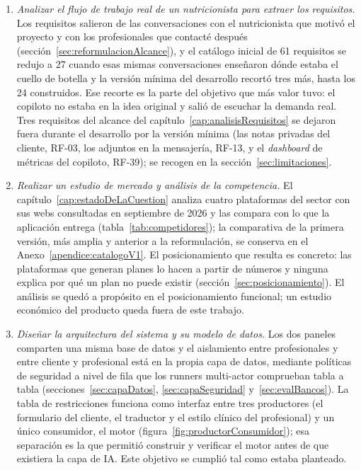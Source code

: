 \begin{enumerate}
    \item \textit{Analizar el flujo de trabajo real de un nutricionista para extraer los requisitos.} Los requisitos salieron de las conversaciones con el nutricionista que motivó el proyecto y con los profesionales que contacté después (sección~\ref{sec:reformulacionAlcance}), y el catálogo inicial de 61 requisitos se redujo a 27 cuando esas mismas conversaciones enseñaron dónde estaba el cuello de botella y la versión mínima del desarrollo recortó tres más, hasta los 24 construidos. Ese recorte es la parte del objetivo que más valor tuvo: el copiloto no estaba en la idea original y salió de escuchar la demanda real. Tres requisitos del alcance del capítulo~\ref{cap:analisisRequisitos} se dejaron fuera durante el desarrollo por la versión mínima (las notas privadas del cliente, RF-03, los adjuntos en la mensajería, RF-13, y el \textit{dashboard} de métricas del copiloto, RF-39); se recogen en la sección~\ref{sec:limitaciones}.

    \item \textit{Realizar un estudio de mercado y análisis de la competencia.} El capítulo~\ref{cap:estadoDeLaCuestion} analiza cuatro plataformas del sector con sus webs consultadas en septiembre de 2026 y las compara con lo que la aplicación entrega (tabla~\ref{tab:competidores}); la comparativa de la primera versión, más amplia y anterior a la reformulación, se conserva en el Anexo~\ref{apendice:catalogoV1}. El posicionamiento que resulta es concreto: las plataformas que generan planes lo hacen a partir de números y ninguna explica por qué un plan no puede existir (sección~\ref{sec:posicionamiento}). El análisis se quedó a propósito en el posicionamiento funcional; un estudio económico del producto queda fuera de este trabajo.

    \item \textit{Diseñar la arquitectura del sistema y su modelo de datos.} Los dos paneles comparten una misma base de datos y el aislamiento entre profesionales y entre cliente y profesional está en la propia capa de datos, mediante políticas de seguridad a nivel de fila que los runners multi-actor comprueban tabla a tabla (secciones~\ref{sec:capaDatos}, \ref{sec:capaSeguridad} y~\ref{sec:evalBancos}). La tabla de restricciones funciona como interfaz entre tres productores (el formulario del cliente, el traductor y el estilo clínico del profesional) y un único consumidor, el motor (figura~\ref{fig:productorConsumidor}); esa separación es la que permitió construir y verificar el motor antes de que existiera la capa de IA. Este objetivo se cumplió tal como estaba planteado.


\end{enumerate}
